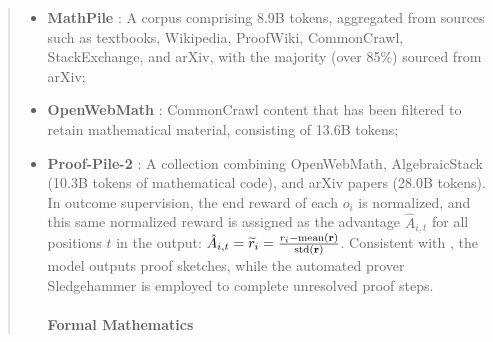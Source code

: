 \begin{abstract}
\begin{itemize}
\begin{itemize}[topsep=0pt]
\begin{itemize}[topsep=0pt]
    \item \textbf{MathPile} \citep{mathpile}: A corpus comprising 8.9B tokens, aggregated from sources such as textbooks, Wikipedia, ProofWiki, CommonCrawl, StackExchange, and arXiv, with the majority (over 85\%) sourced from arXiv;
    \item \textbf{OpenWebMath} \citep{openwebmath}: CommonCrawl content that has been filtered to retain mathematical material, consisting of 13.6B tokens;
    \item \textbf{Proof-Pile-2} \citep{llemma}: A collection combining OpenWebMath, AlgebraicStack (10.3B tokens of mathematical code), and arXiv papers (28.0B tokens). In outcome supervision, the end reward of each $o_i$ is normalized, and this same normalized reward is assigned as the advantage $\hat{A}_{i, t}$ for all positions $t$ in the output: $\hat{A}_{i, t} = \widetilde{r}_i = \frac{r_i- {\rm mean}(\mathbf{r})}{{\rm std}(\mathbf{r})}$. Consistent with \cite{dsp_proof}, the model outputs proof sketches, while the automated prover Sledgehammer \citep{sledgehammer} is employed to complete unresolved proof steps. \paragraph{Formal Mathematics}


\end{itemize}
\end{itemize}
\end{itemize}
\end{abstract}
